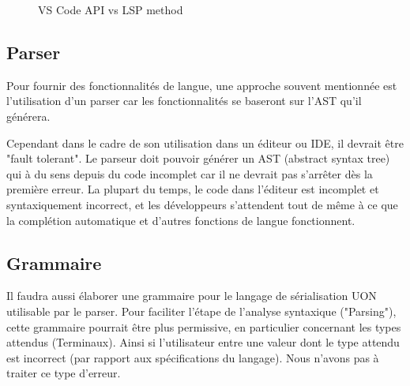 \documentclass[
    iict, %
    il, %
]{heig-tb}
\begin{document}
\begin{figure}[!ht]
    \begin{center}
    \end{center}
    \caption[API vs LSP]{\label{api vs lsp} VS Code API vs LSP method}
\end{figure}

\subsection{Parser}
Pour fournir des fonctionnalités de langue, une approche souvent mentionnée est l'utilisation d'un parser
car les fonctionnalités se baseront sur l'AST qu'il générera.

Cependant dans le cadre de son utilisation dans un éditeur ou IDE, il devrait être "fault tolerant". Le parseur doit pouvoir générer un AST (abstract syntax tree) qui à du sens depuis du code incomplet
car il ne devrait pas s'arrêter dès la première erreur.
La plupart du temps, le code dans l'éditeur est incomplet et syntaxiquement incorrect, et les développeurs s'attendent tout de même à ce que la complétion automatique et d'autres fonctions de langue fonctionnent.


\subsection{Grammaire}
Il faudra aussi élaborer une grammaire pour le langage de sérialisation UON utilisable par le parser.
Pour faciliter l'étape de l'analyse syntaxique ("Parsing"), cette grammaire pourrait être plus permissive, en particulier concernant les types attendus (Terminaux).
Ainsi si l'utilisateur entre une valeur dont le type attendu est incorrect (par rapport aux spécifications du langage). Nous n'avons pas à traiter ce type d'erreur.
\end{document}

